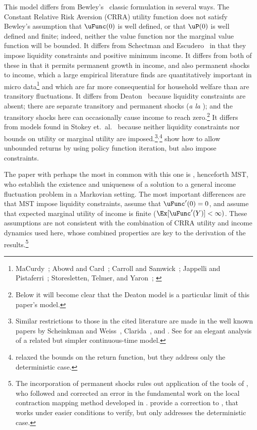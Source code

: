 \documentclass[BufferStockTheory]{subfiles}
\begin{document}
\hypertarget{DiffFromLit}{} This model differs from Bewley's~\citeyearpar{bewleyPIH} classic formulation in several ways. The Constant Relative Risk Aversion (CRRA) utility function does not satisfy Bewley's assumption that $\uFunc(0)$ is well defined, or that $\uP(0)$ is well defined and finite; indeed, neither the value function nor the marginal value function will be bounded.  It differs from Schectman and Escudero~\citeyearpar{seIncFluct} in that they impose liquidity constraints and positive minimum income.  It differs from both of these in that it permits permanent growth in income, and also permanent shocks to income, which a large empirical literature finds are quantitatively important in micro data\footnote{MaCurdy~\citeyearpar{macurdyTimeseries}; Abowd and Card~\citeyearpar{acCovariance}; Carroll and Samwick~\citeyearpar{csNature}; Jappelli and Pistaferri~\citeyearpar{jpCins}; Storesletten, Telmer, and Yaron~\citeyearpar{styConsumption}; \cite{blpRisk}} and which are far more consequential for household welfare than are transitory fluctuations.  It differs from Deaton~\citeyearpar{deatonLiqConstr} because liquidity constraints are absent; there are separate transitory and permanent shocks (\textit{a la} \cite{muthOptimal}); and the transitory shocks here can occasionally cause income to reach zero.\footnote{Below it will become clear that the Deaton model is a particular limit of this paper's model.}  It differs from models found in Stokey et.\ al.~\citeyearpar{slpMethods} because neither liquidity constraints nor bounds on utility or marginal utility are imposed.\footnote{Similar restrictions to those in the cited literature are made in the well known papers by Scheinkman and Weiss~\citeyearpar{scheinkman&weiss:borrowing}, Clarida~\citeyearpar{claridaErgodic}, and \cite{cwcUnderUncert}.  See \cite{tocheUrisk} for an elegant analysis of a related but simpler continuous-time model.}$^{,}$\footnote{\cite{asHomogeneous} relaxed the bounds on the return function, but they address only the deterministic case.} \cite{lsIncFluct} show how to allow unbounded returns by using policy function iteration, but also impose constraints.

The paper with perhaps the most in common with this one is \cite{mstIncFluct}, henceforth MST, who establish the existence and uniqueness of a solution to a general income fluctuation problem in a Markovian setting.  The most important differences are that MST impose liquidity constraints, assume that $\uFunc^{\prime}(0)=0$, and  assume that expected marginal utility of income is finite ($\Ex[\uFunc^{\prime}(Y)]<\infty)$.  These assumptions are not consistent with the combination of CRRA utility and income dynamics used here, whose combined properties are key to the derivation of the results.\footnote{The incorporation of permanent shocks rules out application of the tools of \cite{mnUnique}, who followed and corrected an error in the fundamental work on the local contraction mapping method developed in \cite{rrExistence}.  \cite{mvExistence} provide a correction to \cite{rrExistence}, that works under easier conditions to verify, but only addresses the deterministic case.}
\end{document}
